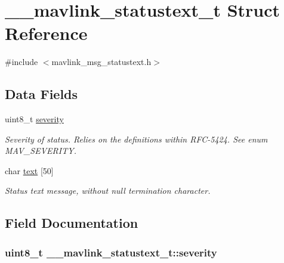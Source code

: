 \hypertarget{struct____mavlink__statustext__t}{\section{\+\_\+\+\_\+mavlink\+\_\+statustext\+\_\+t Struct Reference}
\label{struct____mavlink__statustext__t}
}


{\ttfamily \#include $<$mavlink\+\_\+msg\+\_\+statustext.\+h$>$}

\subsection*{Data Fields}
\begin{DoxyCompactItemize}
\item 
uint8\+\_\+t \hyperlink{struct____mavlink__statustext__t_a3078f8993a445c45f44e2f3127c38291}{severity}
\begin{DoxyCompactList}\small\item\em Severity of status. Relies on the definitions within R\+F\+C-\/5424. See enum M\+A\+V\+\_\+\+S\+E\+V\+E\+R\+I\+T\+Y. \end{DoxyCompactList}\item 
char \hyperlink{struct____mavlink__statustext__t_ad841b35268fabb3a101c2524da5a31be}{text} \mbox{[}50\mbox{]}
\begin{DoxyCompactList}\small\item\em Status text message, without null termination character. \end{DoxyCompactList}\end{DoxyCompactItemize}


\subsection{Field Documentation}
\hypertarget{struct____mavlink__statustext__t_a3078f8993a445c45f44e2f3127c38291}{
\subsubsection[{severity}]{\setlength{\rightskip}{0pt plus 5cm}uint8\+\_\+t \+\_\+\+\_\+mavlink\+\_\+statustext\+\_\+t\+::severity}}\label{struct____mavlink__statustext__t_a3078f8993a445c45f44e2f3127c38291}



